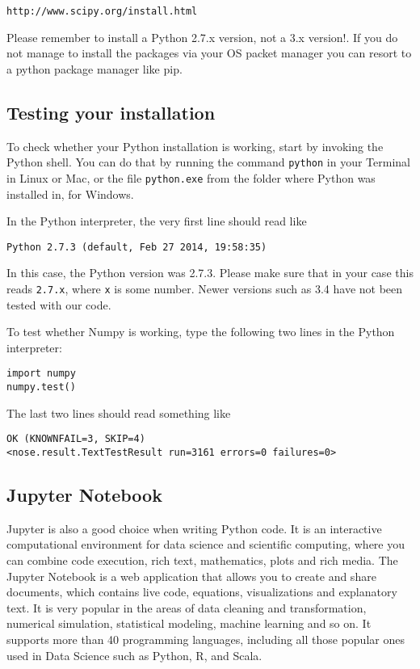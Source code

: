 \begin{verbatim}
http://www.scipy.org/install.html
\end{verbatim}

Please remember to install a Python 2.7.x version, not a 3.x version!. If you
do not manage to install the packages via your OS packet manager you can 
resort to a python package manager like pip.  

\subsection{Testing your installation}

To check whether your Python installation is working, start by invoking the
Python shell. You can do that by running the command \verb+python+ in your
Terminal in Linux or Mac, or the file \verb+python.exe+ from the folder where
Python was installed in, for Windows.

In the Python interpreter, the very first line should read like
\begin{verbatim}
Python 2.7.3 (default, Feb 27 2014, 19:58:35)
\end{verbatim}
%
In this case, the Python version was 2.7.3. Please make sure that in your case
this reads \verb+2.7.x+, where \verb+x+ is some number. Newer versions such as
3.4 have not been tested with our code.

To test whether Numpy is working, type the following two lines in the Python interpreter:
%
\begin{verbatim}
import numpy
numpy.test()
\end{verbatim}
%
The last two lines should read something like
%
\begin{verbatim}
OK (KNOWNFAIL=3, SKIP=4)
<nose.result.TextTestResult run=3161 errors=0 failures=0>
\end{verbatim}

\subsection{Jupyter Notebook}

Jupyter is also a good choice when writing Python code. It is an interactive computational environment for data science and scientific computing, where you can combine code execution, rich text, mathematics, plots and rich media. The Jupyter Notebook is a web application that allows you to create and share documents, which contains live code, equations, visualizations and explanatory text. It is very popular in the areas of data cleaning and transformation, numerical simulation, statistical modeling, machine learning and so on. It supports more than 40 programming languages, including all those popular ones used in Data Science such as Python, R, and Scala.

